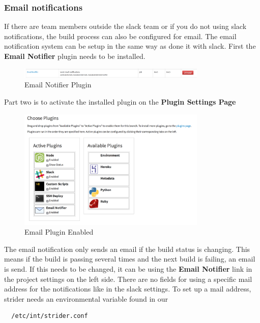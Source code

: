 \subsubsection{Email notifications}
If there are team members outside the slack team or if you do not using slack notifications, the build process can also be configured
for email. The email notification system can be setup in the same way as done it with slack. First the \textbf{Email Notifier}
plugin needs to be installed.

\begin{figure}[h!]
  \centering
  \includegraphics[width=0.8\textwidth]{images/email_notifier.png}
  \caption{Email Notifier Plugin}
\end{figure}

Part two is to activate the installed plugin on the \textbf{Plugin Settings Page}

\begin{figure}[h!]
  \centering
  \includegraphics[width=0.8\textwidth]{images/email_active.png}
  \caption{Email Plugin Enabled}
\end{figure}

The email notification only sends an email if the build status is changing. This means if the build is passing several times and the next
build is failing, an email is send. If this needs to be changed, it can be using the \textbf{Email Notifier} link in the project settings on the left side.
There are no fields for using a specific mail address for the notifications like in the slack settings. To set up a mail address, strider needs an environmental
variable found in our

\begin{lstlisting}
  /etc/int/strider.conf
\end{lstlisting}

